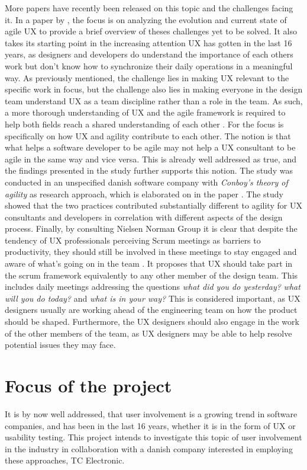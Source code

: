 More papers have recently been released on this topic and the challenges facing it. In a paper by \textcite{PDF:EvolutionofagileUXD}, the focus is on analyzing the evolution and current state of agile UX to provide a brief overview of theses challenges yet to be solved. It also takes its starting point in the increasing attention UX has gotten in the last 16 years, as designers and developers do understand the importance of each others work but don't know how to synchronize their daily operations in a meaningful way. As previously mentioned, the challenge lies in making UX relevant to the specific work in focus, but the challenge also lies in making everyone in the design team understand UX as a team discipline rather than a role in the team. As such, a more thorough understanding of UX and the agile framework is required to help both fields reach a shared understanding of  each other \parencite[][2]{PDF:EvolutionofagileUXD}. For \textcite{WEB:AgilityForUX} the focus is specifically on how UX and agility contribute to each other. The notion is that what helps a software developer to be agile may not help a UX consultant to be agile in the same way and vice versa. This is already well addressed as true, and the findings presented in the study further supports this notion. The study was conducted in an unspecified danish software company with \textit{Conboy's theory of agility} as research approach, which is elaborated on in the paper \parencite[][3]{WEB:AgilityForUX}. The study showed that the two practices contributed substantially different to agility for UX consultants and developers in correlation with different aspects of the design process. Finally, by consulting Nielsen Norman Group it is clear that despite the tendency of UX professionals perceiving Scrum meetings as barriers to productivity, they should still be involved in these meetings to stay engaged and aware of what's going on in the team \parencite{WEB:UXResponsibilitiesInScrum}. It proposes that UX should take part in the scrum framework equivalently to any other member of the design team. This includes daily meetings addressing the questions \textit{what did you do yesterday?} \textit{what will you do today?} and \textit{what is in your way?} This is considered important, as UX designers usually are working ahead of the engineering team on how the product should be shaped. Furthermore, the UX designers should also engage in the work of the other members of the team, as UX designers may be able to help resolve potential issues they may face.


\section{Focus of the project}
\label{ProjectFocus}
It is by now well addressed, that user involvement is a growing trend in software companies, and has been in the last 16 years, whether it is in the form of UX or usability testing. This project intends to investigate this topic of user involvement in the industry in collaboration with a danish company interested in employing these approaches, TC Electronic.\\


